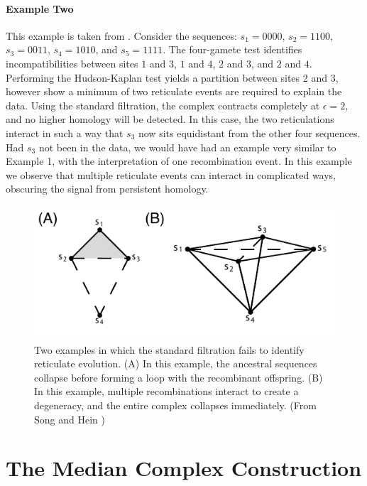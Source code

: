 \paragraph{Example Two}
\label{ex:example2}
%
This example is taken from \cite{Song:2005}.
Consider the sequences: $s_{1}=0000$, $s_{2}=1100$, $s_{3}=0011$, $s_{4}=1010$, and $s_{5}=1111$.
The four-gamete test identifies incompatibilities between sites $1$ and $3$, $1$ and $4$, $2$ and $3$, and $2$ and $4$.
Performing the Hudson-Kaplan test yields a partition between sites 2 and 3, however \cite{Song:2005} show a minimum of two reticulate events are required to explain the data.
Using the standard filtration, the complex contracts completely at $\epsilon=2$, and no higher homology will be detected.
In this case, the two reticulations interact in such a way that $s_3$ now sits equidistant from the other four sequences.
Had $s_{3}$ not been in the data, we would have had an example very similar to Example 1, with the interpretation of one recombination event.
In this example we observe that multiple reticulate events can interact in complicated ways, obscuring the signal from persistent homology.

\begin{figure}
\centering
\includegraphics[width=\columnwidth]{./fig/complex_construction/simple_examples_1.pdf}
\caption[Two examples of reduced sensitivity of the Vietoris-Rips Complex]{Two examples in which the standard filtration fails to identify reticulate evolution. (A) In this example, the ancestral sequences collapse before forming a loop with the recombinant offspring. (B) In this example, multiple recombinations interact to create a degeneracy, and the entire complex collapses immediately. (From Song and Hein \cite{Song:2005})}
\label{fig:complex_construction:simple_examples}
\end{figure}

\section{The Median Complex Construction}
\label{complex_construction:median_complex}

